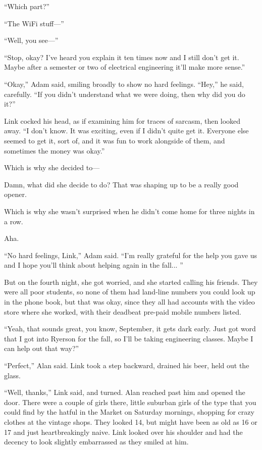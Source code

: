 \documentclass{article}
\begin{document}
``Which part?''

``The WiFi stuff---''

``Well, you see---''

``Stop, okay?  I've heard you explain it ten times now and I still
don't get it.  Maybe after a semester or two of electrical engineering
it'll make more sense.''

``Okay,'' Adam said, smiling broadly to show no hard feelings. 
``Hey,'' he said, carefully.  ``If you didn't understand what we were
doing, then why did you do it?''

Link cocked his head, as if examining him for traces of sarcasm, then
looked away.  ``I don't know.  It was exciting, even if I didn't quite
get it.  Everyone else seemed to get it, sort of, and it was fun to
work alongside of them, and sometimes the money was okay.''

Which is why she decided to---

Damn, what did she decide to do?  That was shaping up to be a really
good opener.

Which is why she wasn't surprised when he didn't come home for three
nights in a row.

Aha.

``No hard feelings, Link,'' Adam said.  ``I'm really grateful for the
help you gave us and I hope you'll think about helping again in the
fall...  ''

But on the fourth night, she got worried, and she started calling his
friends.  They were all poor students, so none of them had land-line
numbers you could look up in the phone book, but that was okay, since
they all had accounts with the video store where she worked, with
their deadbeat pre-paid mobile numbers listed.

``Yeah, that sounds great, you know, September, it gets dark early. 
Just got word that I got into Ryerson for the fall, so I'll be taking
engineering classes.  Maybe I can help out that way?''

``Perfect,'' Alan said.  Link took a step backward, drained his beer,
held out the glass.

``Well, thanks,'' Link said, and turned.  Alan reached past him and
opened the door.  There were a couple of girls there, little suburban
girls of the type that you could find by the hatful in the Market on
Saturday mornings, shopping for crazy clothes at the vintage shops. 
They looked 14, but might have been as old as 16 or 17 and just
heartbreakingly naive.  Link looked over his shoulder and had the
decency to look slightly embarrassed as they smiled at him.
\end{document}
